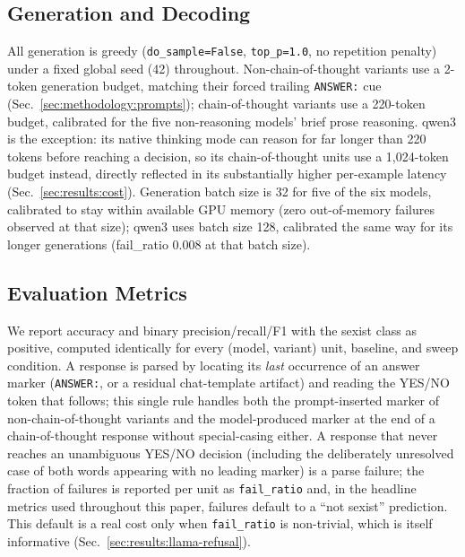 \subsection{Generation and Decoding}
\label{sec:experimental:generation}

All generation is greedy (\texttt{do\_sample=False}, \texttt{top\_p=1.0},
no repetition penalty) under a fixed global seed (42) throughout.
Non-chain-of-thought variants use a 2-token generation budget, matching
their forced trailing \texttt{ANSWER:} cue
(Sec.~\ref{sec:methodology:prompts}); chain-of-thought variants use a
220-token budget, calibrated for the five non-reasoning models' brief
prose reasoning. qwen3 is the exception: its native thinking mode can
reason for far longer than 220 tokens before reaching a decision, so its
chain-of-thought units use a 1,024-token budget instead, directly
reflected in its substantially higher per-example latency
(Sec.~\ref{sec:results:cost}). Generation batch size is 32 for five of the
six models, calibrated to stay within available GPU memory (zero
out-of-memory failures observed at that size); qwen3 uses batch size
128, calibrated the same way for its longer generations
(fail\_ratio 0.008 at that batch size).

\subsection{Evaluation Metrics}
\label{sec:experimental:metrics}

We report accuracy and binary precision/recall/F1 with the sexist class as
positive, computed identically for every (model, variant) unit, baseline,
and sweep condition. A response is parsed by locating its \emph{last}
occurrence of an answer marker (\texttt{ANSWER:}, or a residual
chat-template artifact) and reading the YES/NO token that follows; this
single rule handles both the prompt-inserted marker of non-chain-of-thought
variants and the model-produced marker at the end of a chain-of-thought
response without special-casing either. A response that never reaches an
unambiguous YES/NO decision (including the deliberately unresolved case
of both words appearing with no leading marker) is a parse failure; the
fraction of failures is reported per unit as \texttt{fail\_ratio} and, in
the headline metrics used throughout this paper, failures default to a
``not sexist'' prediction. This default is a real cost only when
\texttt{fail\_ratio} is non-trivial, which is itself informative
(Sec.~\ref{sec:results:llama-refusal}).
